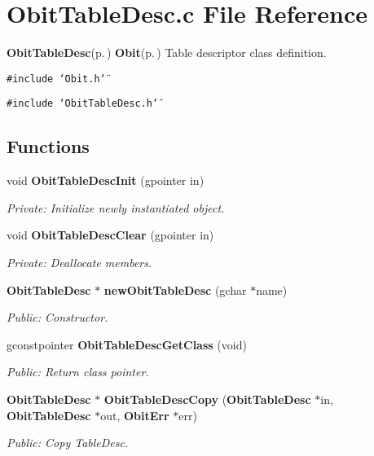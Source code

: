 \section{Obit\-Table\-Desc.c File Reference}
\label{ObitTableDesc_8c}
{\bf Obit\-Table\-Desc}{\rm (p.\,\pageref{structObitTableDesc})} {\bf Obit}{\rm (p.\,\pageref{structObit})} Table descriptor class definition. 

{\tt \#include \char`\"{}Obit.h\char`\"{}}\par
{\tt \#include \char`\"{}Obit\-Table\-Desc.h\char`\"{}}\par
\subsection*{Functions}
\begin{CompactItemize}
\item 
void {\bf Obit\-Table\-Desc\-Init} (gpointer in)
\begin{CompactList}\small\item\em Private: Initialize newly instantiated object. \item\end{CompactList}\item 
void {\bf Obit\-Table\-Desc\-Clear} (gpointer in)
\begin{CompactList}\small\item\em Private: Deallocate members. \item\end{CompactList}\item 
{\bf Obit\-Table\-Desc} $\ast$ {\bf new\-Obit\-Table\-Desc} (gchar $\ast$name)
\begin{CompactList}\small\item\em Public: Constructor. \item\end{CompactList}\item 
gconstpointer {\bf Obit\-Table\-Desc\-Get\-Class} (void)
\begin{CompactList}\small\item\em Public: Return class pointer. \item\end{CompactList}\item 
{\bf Obit\-Table\-Desc} $\ast$ {\bf Obit\-Table\-Desc\-Copy} ({\bf Obit\-Table\-Desc} $\ast$in, {\bf Obit\-Table\-Desc} $\ast$out, {\bf Obit\-Err} $\ast$err)
\begin{CompactList}\small\item\em Public: Copy Table\-Desc. \item\end{CompactList}\item 

\end{CompactItemize}
